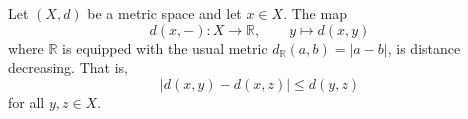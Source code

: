 Let $(X, d)$ be a metric space and let $x \in X$. The map
$$d(x, -): X \longrightarrow \mathbb{R}, \qquad y \longmapsto d(x, y)$$
where $\mathbb{R}$ is equipped with the usual metric $d_{\mathbb{R}}(a, b) = |a - b|$, is distance decreasing. That is,
$$|d(x, y) - d(x, z)| \leq d(y, z)$$
for all $y, z \in X$.
